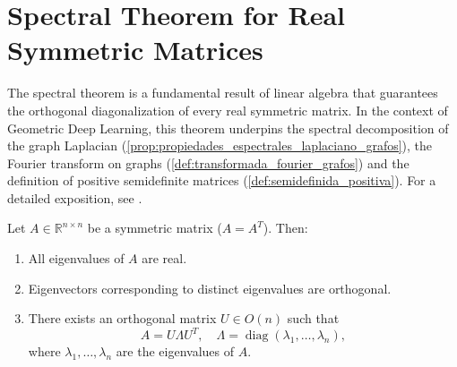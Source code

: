 
\section{Spectral Theorem for Real Symmetric Matrices}\label{sec:teorema_espectral}

The spectral theorem is a fundamental result of linear algebra that guarantees the orthogonal diagonalization of every real symmetric matrix. In the context of Geometric Deep Learning, this theorem underpins the spectral decomposition of the graph Laplacian (\autoref{prop:propiedades_espectrales_laplaciano_grafos}), the Fourier transform on graphs (\autoref{def:transformada_fourier_grafos}) and the definition of positive semidefinite matrices (\autoref{def:semidefinida_positiva}). For a detailed exposition, see \citet[Ch.~7]{Axler2015}.

\begin{theorem}\label{thm:espectral_matrices_simetricas}
	Let $A \in \mathbb{R}^{n \times n}$ be a symmetric matrix ($A = A^T$). Then:
	\begin{enumerate}
		\item All eigenvalues of $A$ are real.
		\item Eigenvectors corresponding to distinct eigenvalues are orthogonal.
		\item There exists an orthogonal matrix $U \in O(n)$ such that
		\[
			A = U \Lambda U^T, \quad \Lambda = \operatorname{diag}(\lambda_1, \ldots, \lambda_n),
		\]
		where $\lambda_1, \ldots, \lambda_n$ are the eigenvalues of $A$.
	\end{enumerate}
\end{theorem}

